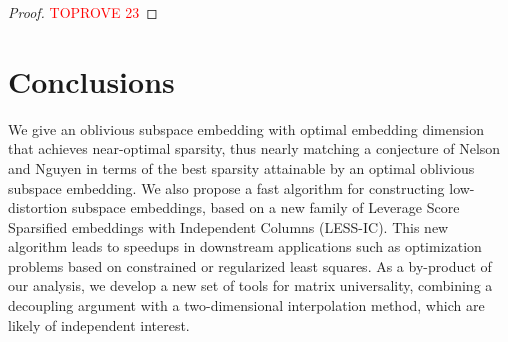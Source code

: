 \documentclass[11pt]{amsart}
\numberwithin{equation}{section}
\numberwithin{equation}{section}
\theoremstyle{remark}
\theoremstyle{definition}
\begin{document}
\begin{proof}\textcolor{red}{TOPROVE 23}\end{proof} 
\section{Conclusions}

We give an oblivious subspace embedding with optimal embedding dimension that achieves near-optimal sparsity, thus nearly matching a conjecture of Nelson and Nguyen in terms of the best sparsity attainable by an optimal oblivious subspace embedding. We also propose a fast algorithm for constructing low-distortion subspace embeddings, based on a new family of Leverage Score Sparsified embeddings with Independent Columns (LESS-IC). This new algorithm leads to speedups in downstream applications such as optimization problems based on constrained or regularized least squares. As a by-product of our analysis, we develop a new set of tools for matrix universality, combining a decoupling argument with a two-dimensional interpolation method, which are likely of independent interest. 


\printbibliography
\end{document}
